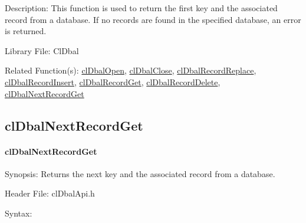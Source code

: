 \begin{flushleft}
\begin{Desc}
\item[Description:]This function is used to return the first key and the associated record from a database. If no records are found in the specified 
database, an error is returned.\end{Desc}
\begin{Desc}
\item[Library File:]Cl\-Dbal\end{Desc}
\begin{Desc}
\item[Related Function(s):]\hyperlink{pagedbal103}{cl\-Dbal\-Open}, \hyperlink{pagedbal104}{cl\-Dbal\-Close}, 
\hyperlink{pagedbal106}{cl\-Dbal\-Record\-Replace}, \hyperlink{pagedbal105}{cl\-Dbal\-Record\-Insert},
\hyperlink{pagedbal107}{cl\-Dbal\-Record\-Get}, \hyperlink{pagedbal108}{cl\-Dbal\-Record\-Delete}, 
\hyperlink{pagedbal110}{cl\-Dbal\-Next\-Record\-Get} \end{Desc}


\newpage

\subsection{clDbalNextRecordGet}
\hypertarget{pagedbal110}{}\paragraph{cl\-Dbal\-Next\-Record\-Get}\label{pagedbal110}
\begin{Desc}
\item[Synopsis:]Returns the next key and the associated record from a database.\end{Desc}
\begin{Desc}
\item[Header File:]clDbalApi.h\end{Desc}
\begin{Desc}
\item[Syntax:]


\end{Desc}
\end{flushleft}
